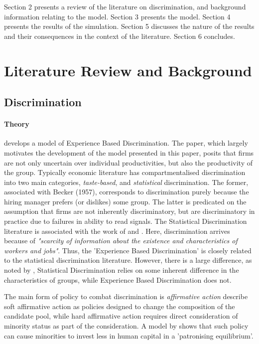 \documentclass[]{article}
\begin{document}

Section 2 presents a review of the literature on discrimination, and background information relating to the model. Section 3 presents the model. Section 4 presents the results of the simulation. Section 5 discusses the nature of the results and their consequences in the context of the literature. Section 6 concludes.
\newpage
\section{Literature Review and Background}

\subsection{Discrimination}
\paragraph{Theory}
\citet{Lepage2024} develops a model of Experience Based Discrimination. The paper, which largely motivates the development of the model presented in this paper, posits that firms are not only uncertain over individual productivities, but also the productivity of the group. Typically economic literature has compartmentalised discrimination into two main categories, \textit{taste-based}, and \textit{statistical} discrimination. The former, associated with Becker (1957), corresponds to discrimination purely because the hiring manager prefers (or dislikes) some group. The latter is predicated on the assumption that firms are not inherently discriminatory, but are discriminatory in practice due to failures in ability to read signals. The Statistical Discrimination literature is associated with the work of \citet{Arrow1973} and \citet{phelpsstat}. Here, discrimination arrives because of \textit{"scarcity of information about the existence and characteristics of workers and jobs"}. Thus, the 'Experience Based Discrimination' is closely related to the statistical discrimination literature. However, there is a large difference, as noted by \citet{Lepage2024}, Statistical Discrimination relies on some inherent difference in the characteristics of groups, while Experience Based Discrimination does not.

The main form of policy to combat discrimination is \textit{affirmative action} \citet{FershtmanPavan2021} describe soft affirmative action as policies designed to change the composition of the candidate pool, while hard affirmative action requires direct consideration of minority status as part of the consideration. A model by \citet{CoatesLoury1993} shows that such policy can cause minorities to invest less in human capital in a 'patronising equilibrium'.
\end{document}
